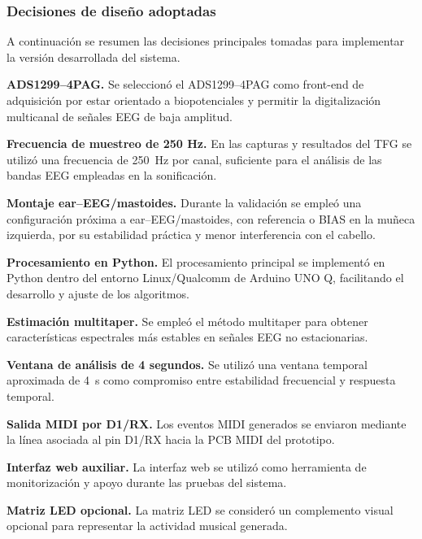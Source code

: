 \documentclass[../main.tex]{subfiles}
\begin{document}
\subsubsection{Decisiones de diseño adoptadas}

A continuación se resumen las decisiones principales tomadas para implementar la versión desarrollada del sistema.

\begin{description}[leftmargin=!,labelwidth=1.8cm]

    \item[DD-1] \textbf{ADS1299--4PAG.} Se seleccionó el ADS1299--4PAG como front-end de adquisición por estar orientado a biopotenciales y permitir la digitalización multicanal de señales EEG de baja amplitud.

    \item[DD-2] \textbf{Frecuencia de muestreo de 250 Hz.} En las capturas y resultados del TFG se utilizó una frecuencia de \SI{250}{\hertz} por canal, suficiente para el análisis de las bandas EEG empleadas en la sonificación.

    \item[DD-3] \textbf{Montaje ear--EEG/mastoides.} Durante la validación se empleó una configuración próxima a ear--EEG/mastoides, con referencia o BIAS en la muñeca izquierda, por su estabilidad práctica y menor interferencia con el cabello.

    \item[DD-4] \textbf{Procesamiento en Python.} El procesamiento principal se implementó en Python dentro del entorno Linux/Qualcomm de Arduino UNO Q, facilitando el desarrollo y ajuste de los algoritmos.

    \item[DD-5] \textbf{Estimación multitaper.} Se empleó el método multitaper para obtener características espectrales más estables en señales EEG no estacionarias.

    \item[DD-6] \textbf{Ventana de análisis de 4 segundos.} Se utilizó una ventana temporal aproximada de \SI{4}{\second} como compromiso entre estabilidad frecuencial y respuesta temporal.

    \item[DD-7] \textbf{Salida MIDI por D1/RX.} Los eventos MIDI generados se enviaron mediante la línea asociada al pin D1/RX hacia la PCB MIDI del prototipo.

    \item[DD-8] \textbf{Interfaz web auxiliar.} La interfaz web se utilizó como herramienta de monitorización y apoyo durante las pruebas del sistema.

    \item[DD-9] \textbf{Matriz LED opcional.} La matriz LED se consideró un complemento visual opcional para representar la actividad musical generada.

\end{description}
\end{document}
